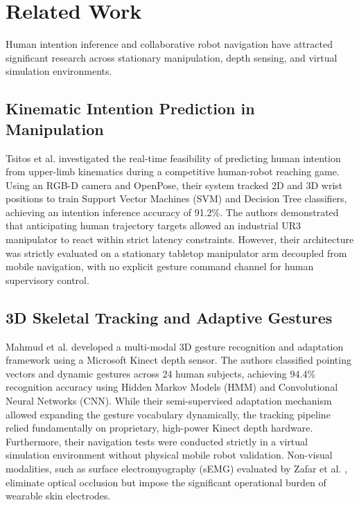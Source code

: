 \documentclass[journal]{IEEEtran}
\begin{document}
\section{Related Work}
Human intention inference and collaborative robot navigation have attracted significant research across stationary manipulation, depth sensing, and virtual simulation environments.

\subsection{Kinematic Intention Prediction in Manipulation}
Tsitos et al. \cite{tsitos2022} investigated the real-time feasibility of predicting human intention from upper-limb kinematics during a competitive human-robot reaching game. Using an RGB-D camera and OpenPose, their system tracked 2D and 3D wrist positions to train Support Vector Machines (SVM) and Decision Tree classifiers, achieving an intention inference accuracy of 91.2\%. The authors demonstrated that anticipating human trajectory targets allowed an industrial UR3 manipulator to react within strict latency constraints. However, their architecture was strictly evaluated on a stationary tabletop manipulator arm decoupled from mobile navigation, with no explicit gesture command channel for human supervisory control.

\subsection{3D Skeletal Tracking and Adaptive Gestures}
Mahmud et al. \cite{mahmud2022} developed a multi-modal 3D gesture recognition and adaptation framework using a Microsoft Kinect depth sensor. The authors classified pointing vectors and dynamic gestures across 24 human subjects, achieving 94.4\% recognition accuracy using Hidden Markov Models (HMM) and Convolutional Neural Networks (CNN). While their semi-supervised adaptation mechanism allowed expanding the gesture vocabulary dynamically, the tracking pipeline relied fundamentally on proprietary, high-power Kinect depth hardware. Furthermore, their navigation tests were conducted strictly in a virtual simulation environment without physical mobile robot validation. Non-visual modalities, such as surface electromyography (sEMG) evaluated by Zafar et al. \cite{zafar2023}, eliminate optical occlusion but impose the significant operational burden of wearable skin electrodes.
\end{document}

